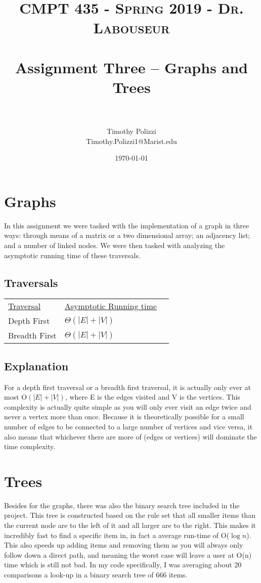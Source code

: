 \documentclass[letterpaper, 10pt]{article}
\title{	
   \normalfont \normalsize 
   \textsc{CMPT 435 - Spring 2019 - Dr. Labouseur} \\[10pt] %
   \horrule{0.5pt} \\[0.25cm] 	%
   \huge Assignment Three -- Graphs and Trees\\     	    %
   \horrule{0.5pt} \\[0.25cm] 	%
}
\author{Timothy Polizzi \\ \normalsize Timothy.Polizzi1@Marist.edu}
\date{\normalsize\today} 	%
\begin{document}
\maketitle %


\noindent

\section{Graphs}
In this assignment we were tasked with the implementation of a graph in three ways: through means of a matrix or a two dimensional array; an adjacency list; and a number of linked nodes. We were then tasked with analyzing the asymptotic running time of these traversals.

\subsection{Traversals}
\begin{tabular}{lll}
\underline{ Traversal } & \underline{Asymptotic Running time}\\
Depth First     & $\Theta(|E| + |V|)$\\
Breadth First   & $\Theta(|E| + |V|)$\\
\end{tabular}

\subsection{Explanation}
For a depth first traversal or a breadth first traversal, it is actually only ever at most O$(|E| + |V|)$, where E is the edges visited and V is the vertices. This complexity is actually quite simple as you will only ever visit an edge twice and never a vertex more than once. Because it is theoretically possible for a small number of edges to be connected to a large number of vertices and vice versa, it also means that whichever there are more of (edges or vertices) will dominate the time complexity.

\section{Trees}
Besides for the graphs, there was also the binary search tree included in the project. This tree is constructed based on the rule set that all smaller items than the current node are to the left of it and all larger are to the right. This makes it incredibly fast to find a specific item in, in fact a average run-time of O($\log n$). This also speeds up adding items and removing them as you will always only follow down a direct path, and meaning the worst case will leave a user at O(n) time which is still not bad. In my code specifically, I was averaging about 20 comparisons a look-up in a binary search tree of 666 items.
\end{document}
